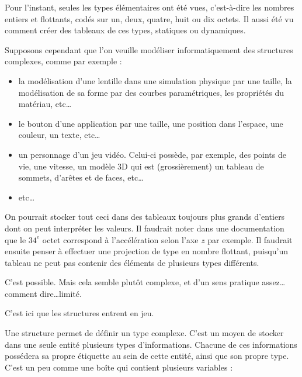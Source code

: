 \documentclass[../../../main.tex]{subfiles}
\begin{document}
Pour l'instant, seules les types élémentaires ont été vues, c'est-à-dire les nombres entiers et flottants, codés sur un, deux, quatre, huit ou dix octets. Il aussi été vu comment créer des tableaux de ces types, statiques ou dynamiques.
 
Supposons cependant que l'on veuille modéliser informatiquement des structures complexes, comme par exemple :
\begin{itemize}
	\item la modélisation d'une lentille dans une simulation physique par une taille, la modélisation de sa forme par des courbes paramétriques, les propriétés du matériau, etc\dots
	\item le bouton d'une application par une taille, une position dans l'espace, une couleur, un texte, etc\dots
	\item un personnage d'un jeu vidéo. Celui-ci possède, par exemple, des points de vie, une vitesse, un modèle 3D qui est (grossièrement) un tableau de sommets, d'arêtes et de faces, etc\dots
	\item etc\dots
\end{itemize}
On pourrait stocker tout ceci dans des tableaux toujours plus grands d'entiers dont on peut interpréter les valeurs. 
Il faudrait noter dans une documentation que le $34^e$ octet correspond à l'accélération selon l'axe $z$ par exemple. Il faudrait ensuite penser à effectuer une projection de type en nombre flottant, puisqu'un tableau ne peut pas contenir des éléments de plusieurs types différents.
 
C'est possible. Mais cela semble plutôt complexe, et d'un sens pratique assez\dots comment dire\dots limité.
 
C'est ici que les structures entrent en jeu.

Une structure permet de définir un type complexe. C'est un moyen de stocker dans une seule entité plusieurs types d'informations. Chacune de ces informations possédera sa propre étiquette au sein de cette entité, ainsi que son propre type. C'est un peu comme une boîte qui contient plusieurs variables : 

\begin{minipage}{\textwidth}
	\begin{center}
		
	\end{center}
\end{minipage}
 
\end{document}

